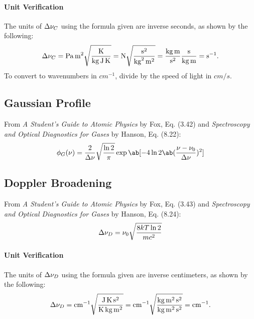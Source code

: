 \documentclass[11pt, twoside, fleqn]{report}
\begin{document}
    \paragraph{Unit Verification}

    The units of $\adif{\nu}_{C}$ using the formula given are inverse seconds, as shown by the following:
    \begin{equation*}
        \adif{\nu}_{C} = \unit{Pa.m^{2}}\sqrt{\frac{\unit{K}}{\unit{kg.J.K}}} = \unit{N}\sqrt{\frac{\unit{s^{2}}}{\unit{kg^{2}.m^{2}}}} = \frac{\unit{kg.m}}{\unit{s^{2}}}\frac{\unit{s}}{\unit{kg.m}} = \unit{s^{-1}}.
    \end{equation*}
    To convert to wavenumbers in $\unit{cm^{-1}}$, divide by the speed of light in $\unit{cm/s}$.

    \subsection{Gaussian Profile}

    From \textit{A Student's Guide to Atomic Physics} by Fox, Eq. (3.42) and \textit{Spectroscopy and Optical Diagnostics for Gases} by Hanson, Eq. (8.22):
    \begin{equation*}
        \phi_{G}(\nu) = \frac{2}{\adif{\nu}}\sqrt{\frac{\ln{2}}{\pi}}\exp\ab[-4\ln{2}\ab(\frac{\nu - \nu_{0}}{\adif{\nu}})^{2}]
    \end{equation*}

    \subsection{Doppler Broadening}

    From \textit{A Student's Guide to Atomic Physics} by Fox, Eq. (3.43) and \textit{Spectroscopy and Optical Diagnostics for Gases} by Hanson, Eq. (8.24):
    \begin{equation*}
        \adif{\nu}_{D} = \nu_{0}\sqrt{\frac{8kT\ln{2}}{mc^{2}}}
    \end{equation*}

    \paragraph{Unit Verification}

    The units of $\adif{\nu}_{D}$ using the formula given are inverse centimeters, as shown by the following:
    \begin{equation*}
        \adif{\nu}_{D} = \unit{cm^{-1}}\sqrt{\frac{\unit{J.K.s^{2}}}{\unit{K.kg.m^{2}}}} = \unit{cm^{-1}}\sqrt{\frac{\unit{kg.m^{2}.s^{2}}}{\unit{kg.m^{2}.s^{2}}}} = \unit{cm^{-1}}.
    \end{equation*}
\end{document}
